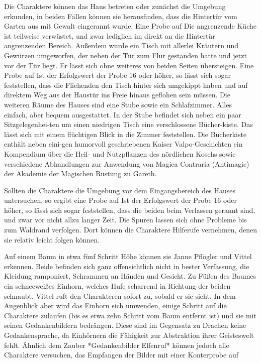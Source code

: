 \platz
Die Charaktere können das Haus betreten oder zunächst die Umgebung erkunden, in beiden Fällen können sie herausfinden, dass die Hintertür vom Garten aus mit Gewalt eingerannt wurde. Eine Probe auf 
\platz
{}
\platz
Die angrenzende Küche ist teilweise verwüstet, und zwar lediglich im direkt an die Hintertür angrenzenden Bereich. Außerdem wurde ein Tisch mit allerlei Kräutern und Gewürzen umgeworfen, der neben der Tür zum Flur gestanden hatte und jetzt vor der Tür liegt. Er lässt sich ohne weiteres von beiden Seiten übersteigen. Eine Probe auf 
\platz
{}
\platz
Ist der Erfolgswert der Probe 16 oder höher, so lässt sich sogar feststellen, dass die Fliehenden den Tisch hinter sich umgekippt haben und auf direktem Weg aus der Haustür ins Freie hinaus geflohen sein müssen. 
\platz
Die weiteren Räume des Hauses sind eine Stube sowie ein Schlafzimmer. Alles einfach, aber bequem ausgestattet. In der Stube befindet sich neben ein paar Sitzgelegenhei-ten um einen niedrigen Tisch eine verschlossene Bücher-kiste. Das lässt sich mit einem flüchtigen Blick in die Zimmer feststellen. Die Bücherkiste enthält neben eini-gen humorvoll geschriebenen Kaiser Valpo-Geschichten ein Kompendium über die Heil- und Nutzpflanzen des nördlichen Koschs sowie verschiedene Abhandlungen zur Anwendung von Magica Contraria (Antimagie) der Akademie der Magischen Rüstung zu Gareth.

Sollten die Charaktere die Umgebung vor dem Eingangsbereich des Hauses untersuchen, so ergibt eine Probe auf 
\platz
{}
\platz
Ist der Erfolgswert der Probe 16 oder höher, so lässt sich sogar feststellen, dass die beiden beim Verlassen gerannt sind, und zwar vor nicht allzu langer Zeit. Die Spuren lassen sich ohne Probleme bis zum Waldrand verfolgen. Dort können die Charaktere Hilferufe vernehmen, denen sie relativ leicht folgen können.

\platz
{}
\platz
Auf einem Baum in etwa fünf Schritt Höhe können sie Janne Pflögler und Vittel erkennen. Beide befinden sich ganz offensichtlich nicht in bester Verfassung, die Kleidung ramponiert, Schrammen an Händen und Gesicht. Zu Füßen des Baumes ein schneeweißes Einhorn, welches Hufe scharrend in Richtung der beiden schnaubt. Vittel ruft den Charakteren sofort zu, sobald er sie sieht. In dem Augenblick aber wird das Einhorn sich umwenden, einige Schritt auf die Charaktere zulaufen (bis es etwa zehn Schritt vom Baum entfernt ist) und sie mit seinen Gedankenbildern bedrängen. Diese sind im Gegensatz zu Drachen keine Gedankensprache, da Einhörnern die Fähigkeit zur Abstraktion ihrer Geisteswelt fehlt. Ähnlich dem Zauber *Gedankenbilder Elfenruf* können jedoch alle Charaktere versuchen, das Empfangen der Bilder mit einer Konterprobe auf 
\platz
{}

